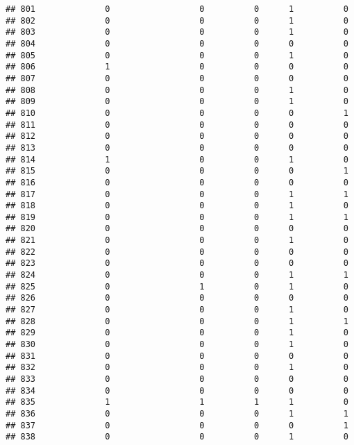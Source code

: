 \documentclass[
]{article}
\begin{document}
\begin{verbatim}
## 801              0                  0          0      1          0
## 802              0                  0          0      1          0
## 803              0                  0          0      1          0
## 804              0                  0          0      0          0
## 805              0                  0          0      1          0
## 806              1                  0          0      0          0
## 807              0                  0          0      0          0
## 808              0                  0          0      1          0
## 809              0                  0          0      1          0
## 810              0                  0          0      0          1
## 811              0                  0          0      0          0
## 812              0                  0          0      0          0
## 813              0                  0          0      0          0
## 814              1                  0          0      1          0
## 815              0                  0          0      0          1
## 816              0                  0          0      0          0
## 817              0                  0          0      1          1
## 818              0                  0          0      1          0
## 819              0                  0          0      1          1
## 820              0                  0          0      0          0
## 821              0                  0          0      1          0
## 822              0                  0          0      0          0
## 823              0                  0          0      0          0
## 824              0                  0          0      1          1
## 825              0                  1          0      1          0
## 826              0                  0          0      0          0
## 827              0                  0          0      1          0
## 828              0                  0          0      1          1
## 829              0                  0          0      1          0
## 830              0                  0          0      1          0
## 831              0                  0          0      0          0
## 832              0                  0          0      1          0
## 833              0                  0          0      0          0
## 834              0                  0          0      0          0
## 835              1                  1          1      1          0
## 836              0                  0          0      1          1
## 837              0                  0          0      0          1
## 838              0                  0          0      1          0

\end{verbatim}
\end{document}
